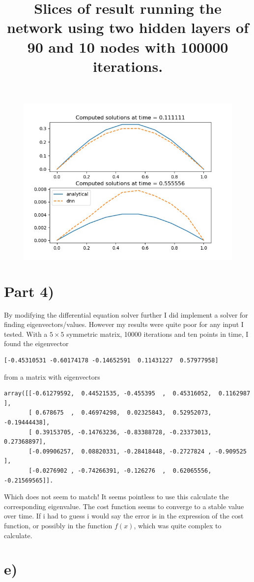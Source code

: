 \documentclass[10pt,a4paper]{article}
\begin{document}
\begin{figure}[!ht]
	
	\begin{center}
		\includegraphics[width=\textwidth]{slices_nn_plot.jpg}
	\end{center}
	\title*{Slices of result running the network using two hidden layers of 90 and 10 nodes with 100000 iterations.}
	\label{nnslice}
	
\end{figure}

\section*{Part 4)}
By modifying the differential equation solver further I did implement a solver for finding eigenvectors/values. However my results were quite poor for any input I tested. With a $5\times 5$ symmetric matrix, 10000 iterations and ten points in time, I found the eigenvector
\begin{verbatim}
[-0.45310531 -0.60174178 -0.14652591  0.11431227  0.57977958]
\end{verbatim}

from a matrix with eigenvectors

\begin{verbatim}
array([[-0.61279592,  0.44521535, -0.455395  ,  0.45316052,  0.1162987 ],
       [ 0.678675  ,  0.46974298,  0.02325843,  0.52952073, -0.19444438],
       [ 0.39153705, -0.14763236, -0.83388728, -0.23373013,  0.27368897],
       [-0.09906257,  0.08820331, -0.28418448, -0.2727824 , -0.909525  ],
       [-0.0276902 , -0.74266391, -0.126276  ,  0.62065556, -0.21569565]].
\end{verbatim}

Which does not seem to match! It seems pointless to use this calculate the corresponding eigenvalue. The cost function seems to converge to a stable value over time. If i had to guess i would say the error is in the expression of the cost function, or possibly in the function $f(x)$, which was quite complex to calculate.

\section*{e)}
\end{document}
